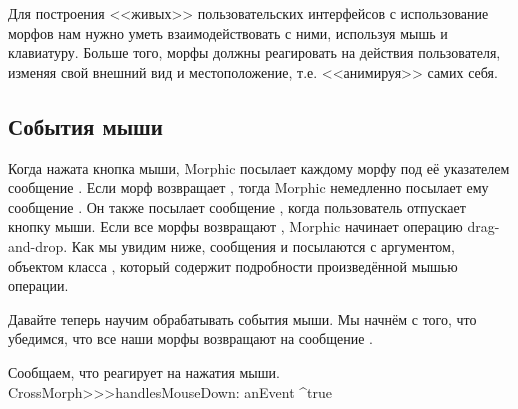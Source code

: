 \documentclass[a4paper,10pt,twoside]{book}
\begin{document}
Для построения <<живых>> пользовательских интерфейсов с использование морфов нам нужно уметь взаимодействовать с ними, используя мышь и клавиатуру.
Больше того, морфы должны реагировать на действия пользователя, изменяя свой внешний вид и местоположение, т.е. <<анимируя>> самих себя.


\subsection{События мыши}

Когда нажата кнопка мыши, Morphic посылает каждому морфу под её указателем сообщение . Если морф возвращает , тогда Morphic немедленно посылает ему сообщение . Он также посылает сообщение , когда пользователь отпускает кнопку мыши.
Если все морфы возвращают , Morphic начинает операцию drag-and-drop.
Как мы увидим ниже, сообщения  и  посылаются с аргументом, объектом класса , который содержит подробности произведённой мышью операции.

Давайте теперь научим  обрабатывать события мыши.
Мы начнём с того, что убедимся, что все наши морфы возвращают  на сообщение .

\begin{method}{Сообщаем, что  реагирует на нажатия мыши.}
CrossMorph>>>handlesMouseDown: anEvent
	^true
\end{method}
\end{document}
